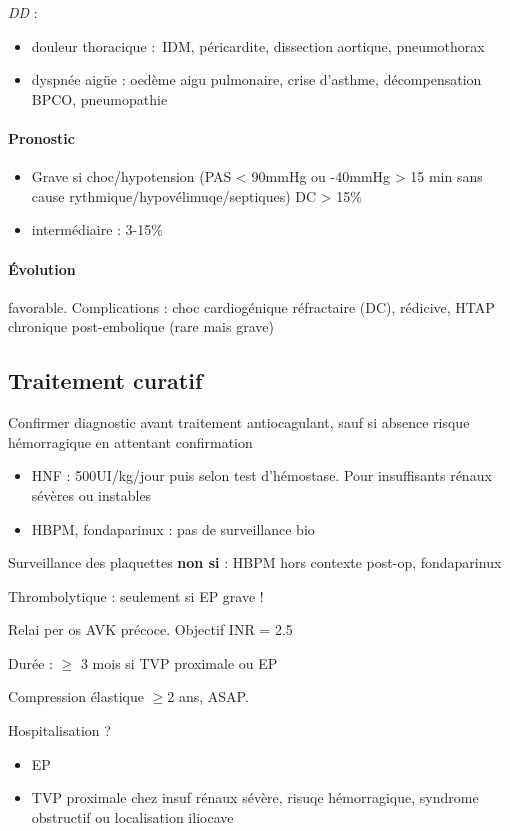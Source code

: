 \documentclass{article}
\begin{document}
\textit{DD} :
\begin{itemize}
  \item douleur thoracique : IDM, péricardite, dissection aortique,
    pneumothorax
  \item dyspnée aigüe : oedème aigu pulmonaire, crise d'asthme, décompensation
    BPCO, pneumopathie
\end{itemize}

\paragraph{Pronostic}
\begin{itemize}
  \item Grave si choc/hypotension (PAS < 90mmHg ou -40mmHg > 15 min sans cause
rythmique/hypovélimuqe/septiques) \thus DC > 15\%
\item intermédiaire : 3-15\%
\end{itemize}

\paragraph{Évolution} favorable. Complications : choc cardiogénique réfractaire
(DC), rédicive, HTAP chronique post-embolique (rare mais grave)

\subsection{Traitement curatif}
Confirmer diagnostic avant traitement antiocagulant, sauf si absence risque
hémorragique en attentant confirmation

\begin{itemize}
  \item HNF : 500UI/kg/jour puis selon test d'hémostase. Pour insuffisants
    rénaux sévères ou instables
  \item HBPM, fondaparinux : pas de surveillance bio
\end{itemize}
Surveillance des plaquettes \textbf{non si}  : HBPM hors contexte post-op,
fondaparinux 

Thrombolytique : seulement si EP grave !

Relai per os AVK précoce. Objectif INR = 2.5

Durée : $\ge$ 3 mois si TVP proximale ou EP

Compression élastique $\ge 2$ ans, ASAP. 

Hospitalisation ? 
\begin{itemize}
  \item EP
  \item TVP proximale chez insuf rénaux sévère, risuqe hémorragique, syndrome
    obstructif ou localisation iliocave
\end{itemize}
\end{document}
